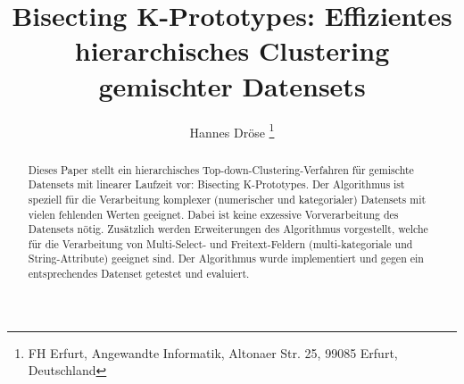 \documentclass[]{lni}
\begin{document}
\title[Bisecting K-Prototypes]{Bisecting K-Prototypes: Effizientes hierarchisches Clustering gemischter Datensets}
\author[Hannes Dröse]{
    Hannes Dröse
    \footnote{FH Erfurt, Angewandte Informatik, Altonaer Str. 25, 99085 Erfurt, Deutschland
    }
}
\maketitle

\begin{abstract}
    Dieses Paper stellt ein hierarchisches Top-down-Clustering-Verfahren für gemischte Datensets mit linearer Laufzeit vor: Bisecting K-Prototypes. Der Algorithmus ist speziell für die Verarbeitung komplexer (numerischer und kategorialer) Datensets mit vielen fehlenden Werten geeignet. Dabei ist keine exzessive Vorverarbeitung des Datensets nötig. Zusätzlich werden Erweiterungen des Algorithmus vorgestellt, welche für die Verarbeitung von Multi-Select- und Freitext-Feldern (multi-kategoriale und String-Attribute) geeignet sind. Der Algorithmus wurde implementiert und gegen ein entsprechendes Datenset getestet und evaluiert.
\end{abstract}




\printbibliography %
\end{document}
